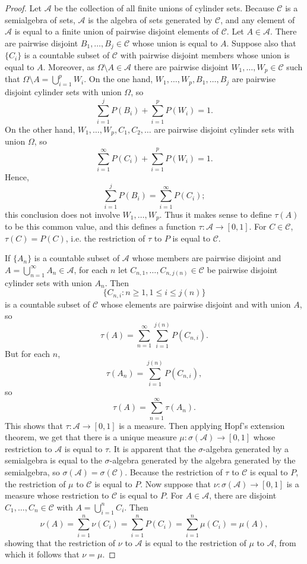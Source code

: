 \documentclass{article}
\theoremstyle{definition}
\theoremstyle{definition}
\begin{document}
\begin{proof}
Let $\mathscr{A}$ be the collection of all finite unions of cylinder sets. Because $\mathscr{C}$ is a semialgebra of sets, $\mathscr{A}$ is the algebra of sets generated
by $\mathscr{C}$, and any element of $\mathscr{A}$ is equal to a finite union of pairwise disjoint elements of $\mathscr{C}$. 
Let $A \in \mathscr{A}$.
There are pairwise disjoint $B_1,\ldots,B_j \in \mathscr{C}$ whose union is equal to $A$. Suppose also that
$\{C_i\}$ is a countable subset of  $\mathscr{C}$ with pairwise disjoint members whose union is equal to $A$.
Moreover, as $\Omega \setminus A \in \mathscr{A}$ there are pairwise disjoint $W_1,\ldots,W_p \in \mathscr{C}$ such that
$\Omega \setminus A = \bigcup_{i=1}^p W_i$.
On the one hand, $W_1,\ldots,W_p,B_1,\ldots,B_j$ are pairwise disjoint cylinder sets with union $\Omega$, so
\[
\sum_{i=1}^j P(B_i) + \sum_{i=1}^p P(W_i)=1.
\]
On the other hand, $W_1,\ldots,W_p,C_1,C_2,\ldots$ are pairwise disjoint cylinder sets with union $\Omega$, so
\[
\sum_{i=1}^\infty P(C_i) + \sum_{i=1}^p P(W_i)=1.
\]
Hence,
\[
\sum_{i=1}^j P(B_i) = \sum_{i=1}^\infty P(C_i);
\]
this conclusion does not involve $W_1,\ldots,W_p$. Thus it makes sense to define $\tau(A)$ to be this common value,
and this defines a function
$\tau:\mathscr{A} \to [0,1]$. For $C \in \mathscr{C}$, $\tau(C)=P(C)$, i.e. the restriction of $\tau$ to $P$ is equal to $\mathscr{C}$. 

If $\{A_n\}$ is a countable subset of $\mathscr{A}$ whose members are pairwise disjoint and
$A=\bigcup_{n=1}^\infty A_n \in \mathscr{A}$, 
for each $n$ let $C_{n,1}, \ldots, C_{n,j(n)} \in \mathscr{C}$ be pairwise disjoint cylinder sets with union
$A_n$. Then
\[
\{C_{n,i}: n \geq 1, 1 \leq i \leq j(n)\}
\]
 is a countable subset of $\mathscr{C}$ whose elements are pairwise
disjoint and with union $A$, so
\[
\tau(A) = \sum_{n=1}^\infty \sum_{i=1}^{j(n)} P(C_{n,i}).
\]
But for each $n$, 
\[
\tau(A_n) = \sum_{i=1}^{j(n)} P(C_{n,i}),
\]
so
\[
\tau(A) = \sum_{n=1}^\infty \tau(A_n).
\]
This shows that $\tau:\mathscr{A} \to [0,1]$ is a measure. 
Then applying Hopf's extension theorem, we get that there is a unique measure $\mu:\sigma(\mathscr{A}) \to [0,1]$ 
whose restriction to $\mathscr{A}$ is equal to $\tau$. 
It is apparent that the $\sigma$-algebra generated by a semialgebra is equal to the $\sigma$-algebra generated by the algebra generated
by the semialgebra, so $\sigma(\mathscr{A})=\sigma(\mathscr{C})$.  Because the restriction of $\tau$ to $\mathscr{C}$ is equal to
$P$, the restriction of $\mu$ to $\mathscr{C}$ is equal to $P$. Now suppose that
$\nu:\sigma(\mathscr{A}) \to [0,1]$ is a measure whose restriction to $\mathscr{C}$ is equal to $P$.
For $A \in \mathscr{A}$, there are disjoint $C_1,\ldots,C_n \in \mathscr{C}$ with $A=\bigcup_{i=1}^n C_i$. 
Then
\[
\nu(A) = \sum_{i=1}^n \nu(C_i) = \sum_{i=1}^n P(C_i) = \sum_{i=1}^n \mu(C_i)
=\mu(A),
\]
showing that the restriction of $\nu$ to $\mathscr{A}$ is equal to the restriction of $\mu$ to $\mathscr{A}$, from which it follows
that $\nu=\mu$.
\end{proof}
\end{document}

